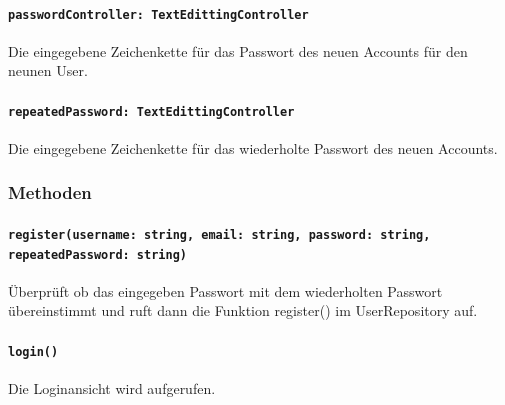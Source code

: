 \documentclass[parskip=full]{scrartcl}
\begin{document}
            \paragraph*{\texttt{passwordController: TextEdittingController}} Die eingegebene Zeichenkette für das Passwort des neuen Accounts für den neunen User.
            \paragraph*{\texttt{repeatedPassword: TextEdittingController}} Die eingegebene Zeichenkette für das wiederholte Passwort des neuen Accounts.
         
        \subsubsection*{Methoden}
            \paragraph*{\texttt{register(username: string, email: string, password: string, repeatedPassword: string)}} Überprüft ob das eingegeben Passwort mit dem wiederholten Passwort übereinstimmt und ruft dann die Funktion register() im UserRepository auf.
            \paragraph*{\texttt{login()}} Die Loginansicht wird aufgerufen.
\end{document}
